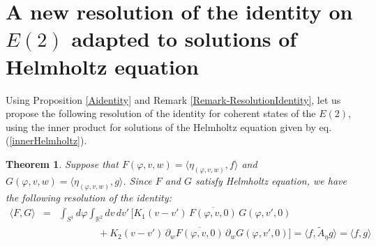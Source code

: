 \documentclass[11pt]{article}
\newtheorem{theorem}[definition]{Theorem}
\newcommand{\R}{\mathbb{R}}
\newcommand{\conj}[1]{\overline{#1}}
\begin{document}

\section{A new resolution of the identity on $E(2)$ adapted to solutions of Helmholtz equation}


Using Proposition \ref{Aidentity} and Remark \ref{Remark-ResolutionIdentity}, let us propose the following resolution of the identity for coherent states of the $E(2)$, using the inner product for solutions of the Helmholtz equation given by eq. (\ref{innerHelmholtz}).

\begin{theorem}
 Suppose that $F(\varphi,v,w)=\langle \eta_{(\varphi,v,w)},f\rangle$ and $G(\varphi,v,w)=\langle \eta_{(\varphi,v,w)},g\rangle$. Since $F$ and $G$ satisfy Helmholtz equation,  we have the following resolution of the identity:
 \begin{eqnarray}
\langle F,G\rangle &=& \int_{S^1}d\varphi\int_{\R^2}dv\,dv'\,\Big[K_1(v-v')\,\conj{F(\varphi,v,0)}\,G(\varphi,v',0)\nonumber\\
  & &\qquad\qquad+K_2(v-v')\,\partial_w \conj{F(\varphi,v,0)}\,\partial_w G(\varphi,v',0)\Big] = \langle f, \tilde{A}_{\eta}g\rangle = \langle f, g\rangle
\end{eqnarray}

\end{theorem}
\end{document}
